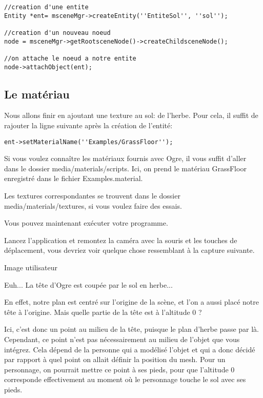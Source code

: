 \documentclass[10pt,a4paper]{report}
\begin{document}
\begin{lstlisting}
//creation d'une entite
Entity *ent= msceneMgr->createEntity(''EntiteSol'', ''sol'');

//creation d'un nouveau noeud
node = msceneMgr->getRootsceneNode()->createChildsceneNode();

//on attache le noeud a notre entite
node->attachObject(ent);
\end{lstlisting}




\subsection{Le mat\'eriau}

Nous allons finir en ajoutant une texture au sol: de l'herbe. Pour cela, il suffit de rajouter la ligne suivante apr\`es la cr\'eation de l'entit\'e:
\begin{lstlisting}
ent->setMaterialName(''Examples/GrassFloor'');
\end{lstlisting}

Si vous voulez conna\^itre les mat\'eriaux fournis avec Ogre, il vous suffit d'aller dans le dossier media/materials/scripts. Ici, on prend le mat\'eriau GrassFloor enregistr\'e dans le fichier Examples.material. 

Les textures correspondantes se trouvent dans le dossier media/materials/textures, si vous voulez faire des essais.


Vous pouvez maintenant ex\'ecuter votre programme.

Lancez l'application et remontez la cam\'era avec la souris et les touches de d\'eplacement, vous devriez voir quelque chose ressemblant \`{a} la capture suivante.

Image utilisateur

Euh... La t\^ete d'Ogre est coup\'ee par le sol en herbe...

En effet, notre plan est centr\'e sur l'origine de la sc\`ene, et l'on a aussi plac\'e notre t\^ete \`{a} l'origine. Mais quelle partie de la t\^ete est \`{a} l'altitude 0 ?

Ici, c'est donc un point au milieu de la t\^ete, puisque le plan d'herbe passe par l\`{a}.
Cependant, ce point n'est pas n\'ecessairement au milieu de l'objet que vous int\'egrez. Cela d\'epend de la personne qui a mod\'elis\'e l'objet et qui a donc d\'ecid\'e par rapport \`{a} quel point on allait d\'efinir la position du mesh. Pour un personnage, on pourrait mettre ce point \`{a} ses pieds, pour que l'altitude 0 corresponde effectivement au moment o\`{u} le personnage touche le sol avec ses pieds.
\end{document}
